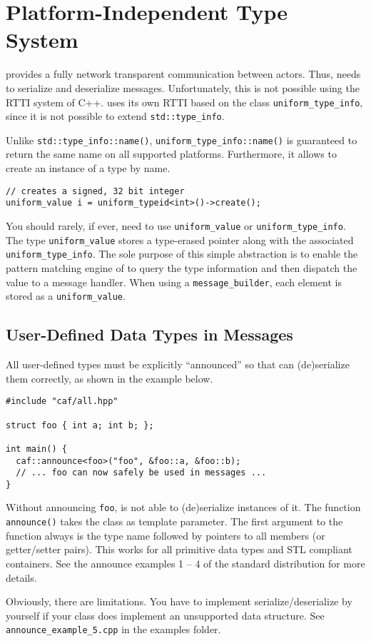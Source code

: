 \section{Platform-Independent Type System}
\label{type-system}

\lib provides a fully network transparent communication between actors.
Thus, \lib needs to serialize and deserialize messages.
Unfortunately, this is not possible using the RTTI system of C++.
\lib uses its own RTTI based on the class \lstinline^uniform_type_info^, since it is not possible to extend \lstinline^std::type_info^.

Unlike \lstinline^std::type_info::name()^, \lstinline^uniform_type_info::name()^ is guaranteed to return the same name on all supported platforms. Furthermore, it allows to create an instance of a type by name.

\begin{lstlisting}
// creates a signed, 32 bit integer
uniform_value i = uniform_typeid<int>()->create();
\end{lstlisting}

You should rarely, if ever, need to use \lstinline^uniform_value^ or \lstinline^uniform_type_info^.
The type \lstinline^uniform_value^ stores a type-erased pointer along with the associated \lstinline^uniform_type_info^.
The sole purpose of this simple abstraction is to enable the pattern matching engine of \lib to query the type information and then dispatch the value to a message handler.
When using a \lstinline^message_builder^, each element is stored as a \lstinline^uniform_value^.

\subsection{User-Defined Data Types in Messages}

All user-defined types must be explicitly ``announced'' so that \lib can (de)serialize them correctly, as shown in the example below.

\begin{lstlisting}
#include "caf/all.hpp"

struct foo { int a; int b; };

int main() {
  caf::announce<foo>("foo", &foo::a, &foo::b);
  // ... foo can now safely be used in messages ...
}
\end{lstlisting}

Without announcing \lstinline^foo^, \lib is not able to (de)serialize instances of it.
The function \lstinline^announce()^ takes the class as template parameter.
The first argument to the function always is the type name followed by pointers to all members (or getter/setter pairs).
This works for all primitive data types and STL compliant containers.
See the announce examples 1 -- 4 of the standard distribution for more details.

Obviously, there are limitations.
You have to implement serialize/deserialize by yourself if your class does implement an unsupported data structure.
See \lstinline^announce_example_5.cpp^ in the examples folder.
